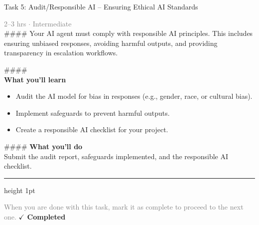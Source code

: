 \documentclass[10pt,a4paper]{article}
\begin{document}
\begin{taskbox}{Task 5: Audit/Responsible AI – Ensuring Ethical AI Standards}

    {\small \textcolor{gray}{2--3 hrs $\cdot$ Intermediate}}\\[12pt]

    \#\#\#\# 
Your AI agent must comply with responsible AI principles. This includes ensuring unbiased responses, avoiding harmful outputs, and providing transparency in escalation workflows.

\#\#\#\# \\[10pt]
\vspace{8pt}
{\large \textbf{\textcolor{brandLight}{What you'll learn}}}\\[4pt]
\begin{itemize}
    \item Audit the AI model for bias in responses (e.g., gender, race, or cultural bias).
    \item Implement safeguards to prevent harmful outputs.
    \item Create a responsible AI checklist for your project.
\end{itemize}

\#\#\#\# \vspace{8pt}
{\large \textbf{\textcolor{brandLight}{What you'll do}}}\\[4pt]
Submit the audit report, safeguards implemented, and the responsible AI checklist.\par

    \vspace{16pt}

    \textcolor{cardBorder}{\hrule height 1pt}\vspace{8pt}

    \small \textcolor{gray}{When you are done with this task, mark it as complete to proceed to the next one.} \hfill \textbf{\textcolor{brandDark}{$\checkmark$ Completed}}

\end{taskbox}
\end{document}
